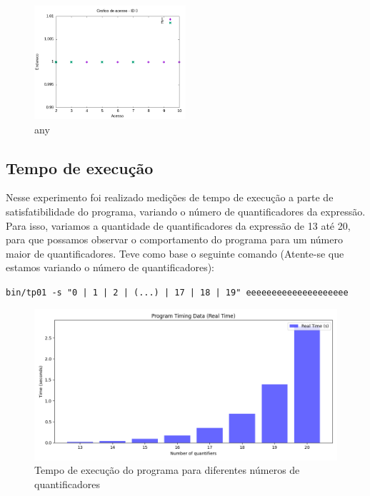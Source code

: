 \documentclass{article}
\begin{document}
\begin{figure}[H]
    \centering
    \includegraphics[width=0.5\textwidth]{./images/sat_tree/registro_s-acesso-0.png}
    \caption{any}
    \label{fig:loc_ref_1}
\end{figure}

\subsection{Tempo de execução}

Nesse experimento foi realizado medições de tempo de execução a parte de satisfatibilidade do programa, variando o número de quantificadores da expressão. Para isso,
variamos a quantidade de quantificadores da expressão de 13 até 20, para que possamos observar o comportamento do programa para um número maior de quantificadores.
Teve como base o seguinte comando (Atente-se que estamos variando o número de quantificadores): 


\verb#bin/tp01 -s "0 | 1 | 2 | (...) | 17 | 18 | 19" eeeeeeeeeeeeeeeeeeee#

\begin{figure}[H]
    \centering
    \includegraphics[width=\textwidth]{./images/time.png}
    \caption{Tempo de execução do programa para diferentes números de quantificadores}
    \label{fig:time}
\end{figure}
\end{document}
